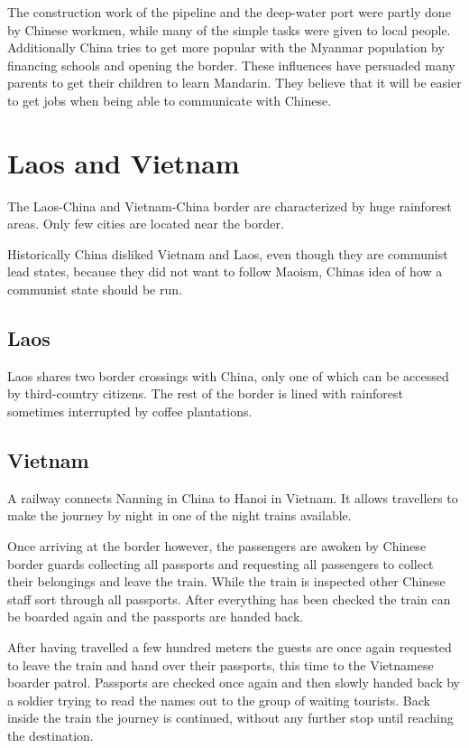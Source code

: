\documentclass[conference]{IEEEtran}
\begin{document}
	The construction work of the pipeline and the deep-water port were partly done by Chinese workmen, while many of the simple tasks were given to local people. Additionally China tries to get more popular with the Myanmar population by financing schools and opening the border. These influences have persuaded many parents to get their children to learn Mandarin. They believe that it will be easier to get jobs when being able to communicate with Chinese\cite{yt_oneVillageTwoCountriesNoBorderTheNewSilkRoadCNAInsider}.
	
	\section{Laos and Vietnam}
	The Laos-China and Vietnam-China border are characterized by huge rainforest areas. Only few cities are located near the border.
	
	Historically China disliked Vietnam and Laos, even though they are communist lead states, because they did not want to follow Maoism, Chinas idea of how a communist state should be run.
	
	\subsection{Laos}
	Laos shares two border crossings with China, only one of which can be accessed by third-country citizens. The rest of the border is lined with rainforest sometimes interrupted by coffee plantations.
	
	\subsection{Vietnam}
	A railway connects Nanning in China to Hanoi in Vietnam. It allows travellers to make the journey by night in one of the night trains available.
	
	Once arriving at the border however, the passengers are awoken by Chinese border guards collecting all passports and requesting all passengers to collect their belongings and leave the train. While the train is inspected other Chinese staff sort through all passports. After everything has been checked the train can be boarded again and the passports are handed back.
	
	After having travelled a few hundred meters the guests are once again requested to leave the train and hand over their passports, this time to the Vietnamese boarder patrol. Passports are checked once again and then slowly handed back by a soldier trying to read the names out to the group of waiting tourists. Back inside the train the journey is continued, without any further stop until reaching the destination.
	
\end{document}
